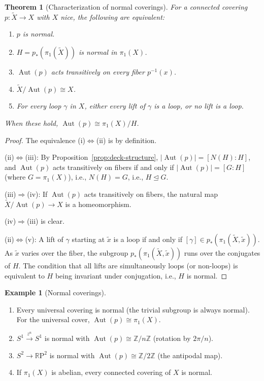 \documentclass[12pt,a4paper,openany]{book}
\theoremstyle{definition}
\newtheorem{example}[definition]{Example}
\theoremstyle{plain}
\newtheorem{theorem}[definition]{Theorem}
\theoremstyle{remark}
\newcommand{\Z}{\mathbb{Z}}
\newcommand{\RP}{\mathbb{R}\mathrm{P}}
\DeclareMathOperator{\Aut}{Aut}
\newcommand{\abs}[1]{\left|#1\right|}
\begin{document}
\begin{theorem}[Characterization of normal coverings]\label{thm:normal-covering-char}
  For a connected covering $p\colon \widetilde{X} \to X$ with $X$ nice, the
  following are equivalent:
  \begin{enumerate}[label=(\roman*)]
    \item $p$ is normal.
    \item $H = p_*(\pi_1(\widetilde{X}))$ is normal in $\pi_1(X)$.
    \item $\Aut(p)$ acts transitively on every fiber $p^{-1}(x)$.
    \item $\widetilde{X} / \Aut(p) \cong X$.
    \item For every loop $\gamma$ in $X$, either every lift of $\gamma$ is a
      loop, or no lift is a loop.
  \end{enumerate}
  When these hold, $\Aut(p) \cong \pi_1(X) / H$.
\end{theorem}

\begin{proof}
  The equivalence (i)$\Leftrightarrow$(ii) is by definition.

  (ii)$\Leftrightarrow$(iii):  By Proposition~\ref{prop:deck-structure},
  $\abs{\Aut(p)} = [N(H):H]$, and $\Aut(p)$ acts transitively on fibers if
  and only if $\abs{\Aut(p)} = [G:H]$ (where $G = \pi_1(X)$), i.e.,
  $N(H) = G$, i.e., $H \trianglelefteq G$.

  (iii)$\Rightarrow$(iv):  If $\Aut(p)$ acts transitively on fibers, the
  natural map $\widetilde{X}/\Aut(p) \to X$ is a homeomorphism.

  (iv)$\Rightarrow$(iii) is clear.

  (ii)$\Leftrightarrow$(v):  A lift of $\gamma$ starting at $\tilde{x}$ is a
  loop if and only if $[\gamma] \in p_*(\pi_1(\widetilde{X}, \tilde{x}))$.
  As $\tilde{x}$ varies over the fiber, the subgroup
  $p_*(\pi_1(\widetilde{X}, \tilde{x}))$ runs over the conjugates of $H$.
  The condition that all lifts are simultaneously loops (or non-loops)
  is equivalent to $H$ being invariant under conjugation, i.e., $H$ is normal.
\end{proof}

\begin{example}[Normal coverings]\label{ex:normal-coverings}
  \begin{enumerate}[label=(\roman*)]
    \item Every universal covering is normal (the trivial subgroup is always
      normal).  For the universal cover, $\Aut(p) \cong \pi_1(X)$.
    \item $S^1 \xrightarrow{z^n} S^1$ is normal with
      $\Aut(p) \cong \Z/n\Z$ (rotation by $2\pi/n$).
    \item $S^2 \to \RP^2$ is normal with $\Aut(p) \cong \Z/2\Z$ (the
      antipodal map).
    \item If $\pi_1(X)$ is abelian, every connected covering of $X$ is
      normal.
  \end{enumerate}
\end{example}
\end{document}

